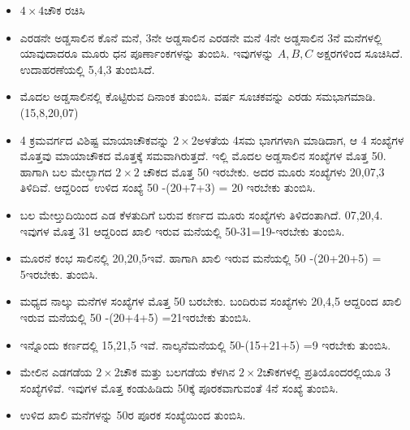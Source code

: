 \begin{itemize}
	\item $4 \times 4$ಚೌಕ ರಚಿಸಿ
	\item ಎರಡನೇ ಅಡ್ಡಸಾಲಿನ ಕೊನೆ ಮನೆ, 3ನೇ ಅಡ್ಡಸಾಲಿನ ಎರಡನೇ ಮನೆ 4ನೇ ಅಡ್ಡ\-ಸಾಲಿನ 3ನೆ ಮನೆಗಳಲ್ಲಿ ಯಾವುದಾದರೂ ಮೂರು ಧನ ಪೂರ್ಣಾಂಕಗಳನ್ನು \hbox{ತುಂಬಿಸಿ.} ಇವುಗಳನ್ನು $A,B,C$ ಅಕ್ಷರಗಳಿಂದ ಸೂಚಿಸಿದೆ. ಉದಾಹರಣೆಯಲ್ಲಿ 5,4,3 ತುಂಬಿಸಿದೆ.
	\item ಮೊದಲ ಅಡ್ಡಸಾಲಿನಲ್ಲಿ ಕೊಟ್ಟಿರುವ ದಿನಾಂಕ ತುಂಬಿಸಿ. ವರ್ಷ ಸೂಚಕವನ್ನು ಎರಡು ಸಮಭಾಗಮಾಡಿ. (15,8,20,07)
	\item 4 ಕ್ರಮವರ್ಗದ ವಿಶಿಷ್ಟ ಮಾಯಾಚೌಕವನ್ನು $2 \times 2$ಅಳತೆಯ 4ಸಮ ಭಾಗಗಳಾಗಿ ಮಾಡಿದಾಗ, ಆ 4 ಸಂಖ್ಯೆಗಳ ಮೊತ್ತವು ಮಾಯಾಚೌಕದ ಮೊತ್ತಕ್ಕೆ ಸಮ\-ವಾಗಿರುತ್ತದೆ. ಇಲ್ಲಿ ಮೊದಲ ಅಡ್ಡಸಾಲಿನ ಸಂಖ್ಯೆಗಳ ಮೊತ್ತ 50. ಹಾಗಾಗಿ ಬಲ ಮೇಲ್ಭಾಗದ $2 \times 2$ ಚೌಕದ ಮೊತ್ತ 50 ಇರಬೇಕು. ಅದರ ಮೂರು ಸಂಖ್ಯೆಗಳು 20,07,3 ತಿಳಿದಿವೆ. \hbox{ಆದ್ದರಿಂದ ಉಳಿದ} ಸಂಖ್ಯೆ 50 -(20+7+3) = 20 ಇರಬೇಕು ತುಂಬಿಸಿ.
	\item ಬಲ ಮೇಲ್ತುದಿಯಿಂದ ಎಡ ಕೆಳತುದಿಗೆ ಬರುವ ಕರ್ಣದ ಮೂರು ಸಂಖ್ಯೆಗಳು ತಿಳಿದಂತಾಗಿದೆ. 07,20,4. ಇವುಗಳ ಮೊತ್ತ 31 ಆದ್ದರಿಂದ ಖಾಲಿ ಇರುವ ಮನೆಯಲ್ಲಿ 50-31=19-ಇರಬೇಕು ತುಂಬಿಸಿ.
	\item ಮೂರನೆ ಕಂಭ ಸಾಲಿನಲ್ಲಿ 20,20,5ಇವೆ. ಹಾಗಾಗಿ ಖಾಲಿ ಇರುವ ಮನೆಯಲ್ಲಿ 50 -(20+20+5) = 5ಇರಬೇಕು. ತುಂಬಿಸಿ.
	\item ಮಧ್ಯದ ನಾಲ್ಕು ಮನೆಗಳ ಸಂಖ್ಯೆಗಳ ಮೊತ್ತ 50 ಬರಬೇಕು. ಬಂದಿರುವ ಸಂಖ್ಯೆಗಳು 20,4,5 ಆದ್ದರಿಂದ ಖಾಲಿ ಇರುವ ಮನೆಯಲ್ಲಿ 50 -(20+4+5) =21ಇರಬೇಕು ತುಂಬಿಸಿ.
	\item ಇನ್ನೊಂದು ಕರ್ಣದಲ್ಲಿ 15,21,5 ಇವೆ. ನಾಲ್ಕನೆಮನೆಯಲ್ಲಿ 50-(15+21+5) =9 ಇರಬೇಕು ತುಂಬಿಸಿ.
	\item ಮೇಲಿನ ಎಡಗಡೆಯ $2 \times 2$ಚೌಕ ಮತ್ತು ಬಲಗಡೆಯ ಕೆಳಗಿನ $2 \times 2$ಚೌಕಗಳಲ್ಲಿ ಪ್ರತಿಯೊಂದರಲ್ಲಿಯೂ 3 ಸಂಖ್ಯೆಗಳಿವೆ. ಇವುಗಳ ಮೊತ್ತ ಕಂಡುಹಿಡಿದು 50ಕ್ಕೆ ಪೂರಕವಾಗುವಂತೆ 4ನೆ ಸಂಖ್ಯೆ ತುಂಬಿಸಿ.
	\item ಉಳಿದ ಖಾಲಿ ಮನೆಗಳನ್ನು 50ರ ಪೂರಕ ಸಂಖ್ಯೆಯಿಂದ ತುಂಬಿಸಿ.
\end{itemize}

